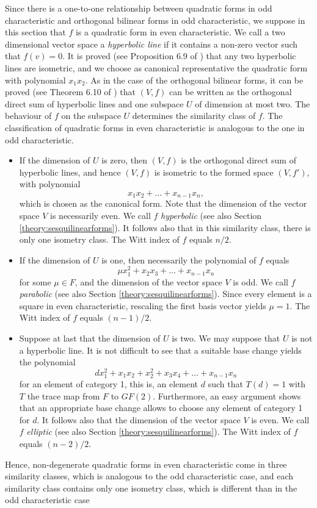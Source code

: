 \documentclass[a4paper,11pt]{report}
\begin{document}
{{Since there is a one-to-one relationship between quadratic forms in odd
characteristic and orthogonal bilinear forms in odd characteristic, we suppose
in this section that $f$ is a quadratic form in even characteristic. We call a two dimensional vector
space a \emph{hyperbolic line} if it contains a non-zero vector such that $f(v) = 0$. It is proved (see Proposition 6.9 of \cite{Cameron}) that any two hyperbolic lines are isometric, and we choose as canonical
representative the quadratic form with polynomial $ x_1 x_2$. As in the case of the orthogonal bilinear forms, it can be proved (see
Theorem 6.10 of \cite{Cameron}) that $(V,f)$ can be written as the orthogonal direct sum of hyperbolic lines and one
subspace $U$ of dimension at most two. The behaviour of $f$ on the subspace $U$ determines the similarity class of $f$. The classification of quadratic forms in even characteristic is analogous to
the one in odd characteristic. 
\begin{itemize}
\item If the dimension of $U$ is zero, then $(V,f)$ is the orthogonal direct sum of hyperbolic lines, and hence $(V,f)$ is isometric to the formed space $(V,f')$, with polynomial 
\[ x_1 x_2 + \ldots + x_{n-1}x_n, \]
 which is chosen as the canonical form. Note that the dimension of the vector
space $V$ is necessarily even. We call $f$ \emph{hyperbolic} (see also Section \ref{theory:sesquilinearforms}). It follows also that in this similarity class, there is only one isometry
class. The Witt index of $f$ equals $n/2$. 
\item If the dimension of $U$ is one, then necessarily the polynomial of $f$ equals 
\[ \mu x_1^2 + x_2 x_3 + \ldots + x_{n-1}x_n \]
 for some $\mu \in F$, and the dimension of the vector space $V$ is odd. We call $f$ \emph{parabolic} (see also Section \ref{theory:sesquilinearforms}). Since every element is a square in even characteristic, rescaling the first
basis vector yields $\mu=1$. The Witt index of $f$ equals $(n-1)/2$. 
\item  Suppose at last that the dimension of $U$ is two. We may suppose that $U$ is not a hyperbolic line. It is not difficult to see that a suitable base
change yields the polynomial 
\[ d x_1^2 + x_1x_2 + x_2^2 + x_3 x_4 + \ldots + x_{n-1}x_n \]
 for an element of category 1, this is, an element $d$ such that $T(d)=1$ with $T$ the trace map from $F$ to $GF(2)$. Furthermore, an easy argument shows that an appropriate base change allows
to choose any element of category 1 for $d$. It follows also that the dimension of the vector space $V$ is even. We call $f$ \emph{elliptic} (see also Section \ref{theory:sesquilinearforms}). The Witt index of $f$ equals $(n-2)/2$. 
\end{itemize}
 Hence, non-degenerate quadratic forms in even characteristic come in three
similarity classes, which is analogous to the odd characteristic case, and
each similarity class contains only one isometry class, which is different
than in the odd characteristic case 

}}
\end{document}
